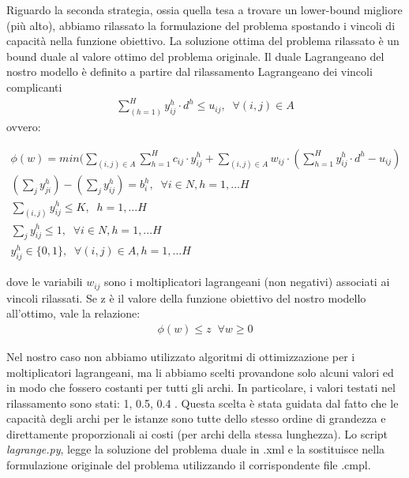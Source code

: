 \documentclass{article}
\begin{document}
Riguardo la seconda strategia, ossia quella tesa a trovare un lower-bound migliore (più alto), abbiamo rilassato la formulazione del problema spostando i vincoli di capacità nella funzione obiettivo. La soluzione ottima del problema rilassato è un bound duale al valore ottimo del problema originale.
Il duale Lagrangeano del nostro modello è definito a partire dal rilassamento Lagrangeano dei vincoli complicanti 
\begin{align}
    \sum_{(h=1)}^H y_{ij}^h \cdot d^h \leq u_{ij}, \; \; \forall (i,j) \in A
    \label{eq:vcap}
\end{align}
ovvero:

\begin{align}
    \phi(w) = min (\sum_{(i,j) \in A}\sum_{h=1}^H c_{ij} \cdot y_{ij}^h + \sum_{(i,j) \in A} w_{ij} \cdot(\sum_{h=1}^H y_{ij}^h \cdot d^h - u_{ij})
    \label{mod:lagobj}
    \\
    (\sum_{j}y_{ji}^h)- (\sum_{j}y_{ij}^h ) = b_i^h, \; \; \forall i \in N, h=1, ... H
    \label{mod:lagv2}
    \\
    \sum_{(i,j)} y_{ij}^h  \leq K, \; \; h=1, ... H
    \label{mod:lagv4}
    \\
    \sum_{j} y_{ij}^h \leq 1, \; \; \forall i \in \textit{N} , h=1, ... H
    \label{mod:lagv5}
    \\
     y_{ij}^h \in \{0,1\}, \; \; \forall (i,j) \in A, h=1, ... H
    \label{mod:lag}
\end{align}


dove le variabili $w_{ij}$ sono i moltiplicatori lagrangeani (non negativi) associati ai vincoli rilassati.
Se z è il valore della funzione obiettivo del nostro modello all'ottimo, vale la relazione:
\begin{align}
 \phi(w) \leq z \; \;     \forall w \geq 0
\end{align}

Nel nostro caso non abbiamo utilizzato algoritmi di ottimizzazione per i moltiplicatori lagrangeani, ma li abbiamo scelti provandone solo alcuni valori ed in modo che fossero costanti per tutti gli archi. In particolare, i valori testati nel rilassamento sono stati: 1, 0.5, 0.4 .
Questa scelta è stata guidata dal fatto che le capacità degli archi per le istanze sono tutte dello stesso ordine di grandezza e direttamente proporzionali ai costi (per archi della stessa lunghezza). Lo script \emph{lagrange.py}, legge la soluzione del problema duale in .xml e la sostituisce nella formulazione originale del problema utilizzando il corrispondente file .cmpl.
\end{document}
